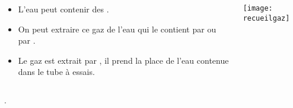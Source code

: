 \begin{mybilan}
	\begin{columns}[c]
		
		\begin{column}{0.5\textwidth}
			\begin{itemize}
				\item L'eau peut contenir des .
				\item On peut extraire ce gaz de l'eau qui le contient par  ou par .
				\item Le gaz est extrait par , il prend la place de l'eau contenue dans le tube à essais.
			\end{itemize}				
		\end{column}
		\begin{column}{0.5\textwidth}
			\texttt{[image: recueilgaz]}
		\end{column}

	
\end{columns}.
\end{mybilan}